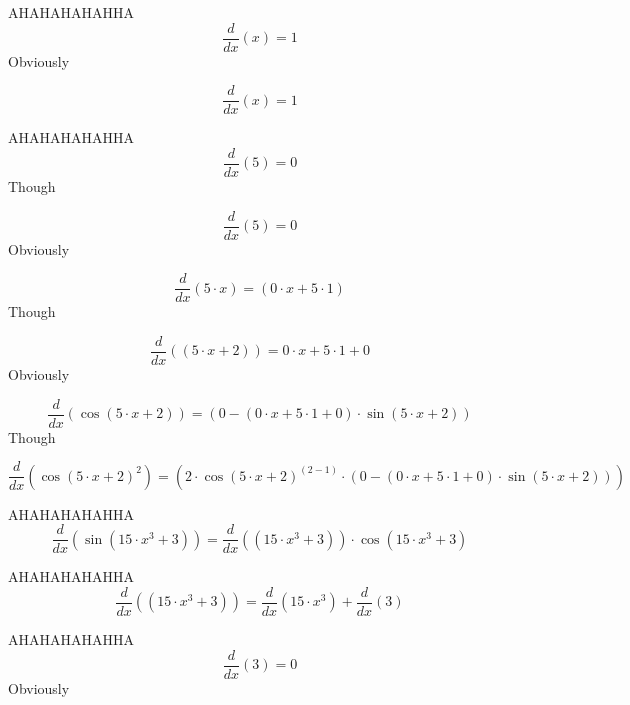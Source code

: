 \documentclass[12pt,a4paper]{extreport}
\begin{document}
AHAHAHAHAHHA
\begin{dmath*}
    \frac{d}{dx}\left(x\right) =  1 
\end{dmath*}
Obviously


\begin{dmath*}
    \frac{d}{dx} \left(x\right) = 1
\end{dmath*}

AHAHAHAHAHHA
\begin{dmath*}
    \frac{d}{dx}\left(5\right) =  0 
\end{dmath*}
Though


\begin{dmath*}
    \frac{d}{dx} \left(5\right) = 0
\end{dmath*}
Obviously


\begin{dmath*}
    \frac{d}{dx} \left(5\cdot x\right) = \left(0\cdot x+5\cdot 1\right)
\end{dmath*}
Though


\begin{dmath*}
    \frac{d}{dx} \left(\left(5\cdot x+2\right)\right) = 0\cdot x+5\cdot 1+0
\end{dmath*}
Obviously


\begin{dmath*}
    \frac{d}{dx} \left(\cos \left(5\cdot x+2\right)\right) = \left(0-\left(0\cdot x+5\cdot 1+0\right)\cdot \sin \left(5\cdot x+2\right)\right)
\end{dmath*}
Though


\begin{dmath*}
    \frac{d}{dx} \left(\cos \left(5\cdot x+2\right)^{2}\right) = \left(2\cdot \cos \left(5\cdot x+2\right)^{\left(2-1\right)}\cdot \left(0-\left(0\cdot x+5\cdot 1+0\right)\cdot \sin \left(5\cdot x+2\right)\right)\right)
\end{dmath*}

AHAHAHAHAHHA
\begin{dmath*}
    \frac{d}{dx}\left(\sin \left(15\cdot x^{3}+3\right)\right) = \frac{d}{dx}\left(\left(15\cdot x^{3}+3\right)\right) \cdot \cos\left(15\cdot x^{3}+3\right)
\end{dmath*}

AHAHAHAHAHHA
\begin{dmath*}
    \frac{d}{dx}\left(\left(15\cdot x^{3}+3\right)\right) = \frac{d}{dx}\left(15\cdot x^{3}\right) + \frac{d}{dx}\left(3\right)
\end{dmath*}

AHAHAHAHAHHA
\begin{dmath*}
    \frac{d}{dx}\left(3\right) =  0 
\end{dmath*}
Obviously
\end{document}
